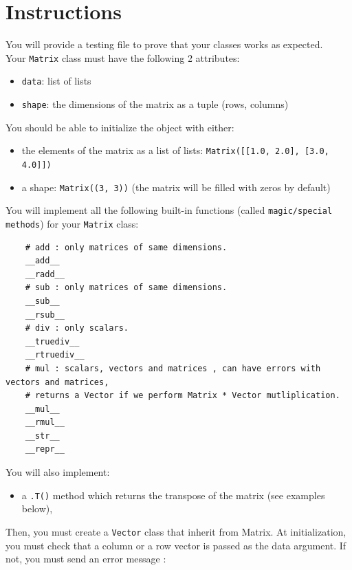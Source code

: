 \documentclass{42-en}
\begin{document}
\section*{Instructions}
You will provide a testing file to prove that your classes works as expected.\\

Your \texttt{Matrix} class must have the following 2 attributes: 
\begin{itemize}
  \item \texttt{data}: list of lists
  \item \texttt{shape}: the dimensions of the matrix as a tuple (rows, columns)
\end{itemize}

You should be able to initialize the object with either:
\begin{itemize}
  \item the elements of the matrix as a list of lists: \texttt{Matrix([[1.0, 2.0], [3.0, 4.0]])}
  \item a shape: \texttt{Matrix((3, 3))} (the matrix will be filled with zeros by default)
\end{itemize}

You will implement all the following built-in functions (called \texttt{magic/special methods}) for your \texttt{Matrix} class:

\begin{verbatim}
    # add : only matrices of same dimensions.
    __add__
    __radd__
    # sub : only matrices of same dimensions.
    __sub__
    __rsub__
    # div : only scalars.
    __truediv__
    __rtruediv__
    # mul : scalars, vectors and matrices , can have errors with vectors and matrices, 
    # returns a Vector if we perform Matrix * Vector mutliplication.
    __mul__
    __rmul__
    __str__
    __repr__
\end{verbatim}

You will also implement: 
\begin{itemize}
  \item a \texttt{.T()} method which returns the transpose of the matrix (see examples below),
\end{itemize}


Then, you must create a \texttt{Vector} class that inherit from Matrix.
At initialization, you must check that a column or a row vector is passed as the data argument.
If not, you must send an error message :
\end{document}
